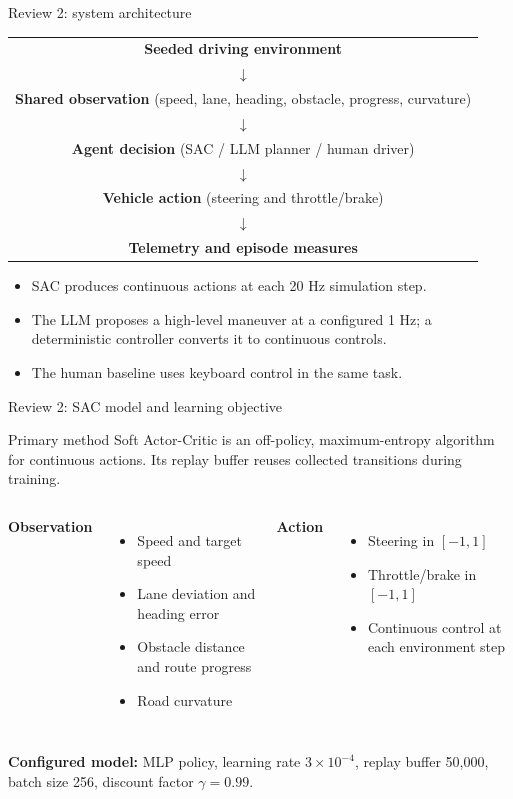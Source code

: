 \documentclass[aspectratio=169,10pt]{beamer}
\begin{document}
\begin{frame}{Review 2: system architecture}
\small
\begin{center}
\begin{tabular}{c}
\textbf{Seeded driving environment} \\
$\downarrow$ \\
\textbf{Shared observation} (speed, lane, heading, obstacle, progress, curvature) \\
$\downarrow$ \\
\textbf{Agent decision} (SAC / LLM planner / human driver) \\
$\downarrow$ \\
\textbf{Vehicle action} (steering and throttle/brake) \\
$\downarrow$ \\
\textbf{Telemetry and episode measures}
\end{tabular}
\end{center}
\begin{itemize}
  \item SAC produces continuous actions at each 20 Hz simulation step.
  \item The LLM proposes a high-level maneuver at a configured 1 Hz; a deterministic controller converts it to continuous controls.
  \item The human baseline uses keyboard control in the same task.
\end{itemize}
\end{frame}

\begin{frame}{Review 2: SAC model and learning objective}
\small
\begin{block}{Primary method}
Soft Actor-Critic is an off-policy, maximum-entropy algorithm for continuous actions. Its replay buffer reuses collected transitions during training.
\end{block}
\begin{columns}[T]
\textbf{Observation}
\begin{itemize}
  \item Speed and target speed
  \item Lane deviation and heading error
  \item Obstacle distance and route progress
  \item Road curvature
\end{itemize}
\textbf{Action}
\begin{itemize}
  \item Steering in $[-1,1]$
  \item Throttle/brake in $[-1,1]$
  \item Continuous control at each environment step
\end{itemize}
\end{columns}
\vspace{0.3em}
\textbf{Configured model:} MLP policy, learning rate $3\times10^{-4}$, replay buffer 50,000, batch size 256, discount factor $\gamma=0.99$.
\end{frame}
\end{document}
